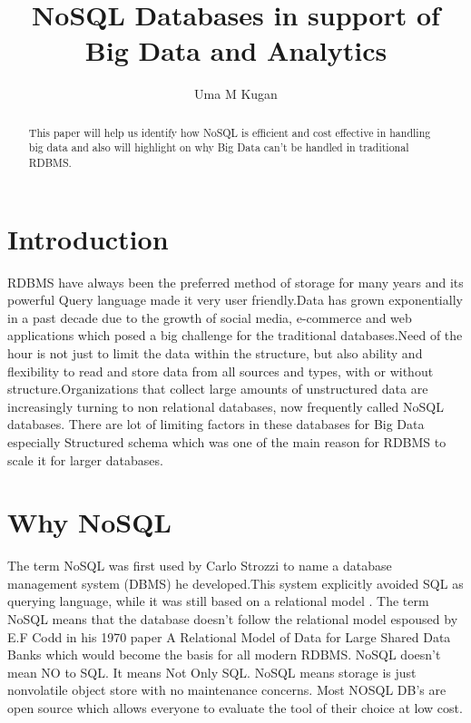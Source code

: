 \documentclass[sigconf]{acmart}
\begin{document}
\title{NoSQL Databases in support of Big Data and Analytics}


\author{Uma M Kugan}

\renewcommand{\shortauthors}{Uma}


\begin{abstract}
This paper will help us identify how NoSQL is efficient and cost effective in handling big data and also will highlight on why Big Data can't be handled in traditional RDBMS.
\end{abstract}



\maketitle

\section{Introduction}

RDBMS have always been the preferred method of storage for many years and its powerful Query language made it very user friendly.Data has grown exponentially in a past decade due to the growth of social media, e-commerce and web applications which posed a big challenge for the traditional databases.Need of the hour is not just to limit the data within the structure, but also ability and flexibility to read and store data from all sources and types, with or without structure.Organizations that collect large amounts of unstructured data are increasingly turning to non relational databases, now frequently called NoSQL databases. \cite{neal} There are lot of limiting factors in these databases for Big Data especially Structured schema which was one of the main reason for RDBMS to scale it for larger databases. \cite{aspirenosql}

\section{Why NoSQL}
The term NoSQL was first used by Carlo Strozzi to name a database management system (DBMS) he developed.This system explicitly avoided SQL as querying language, while it was still based on a relational model \cite{seasupenn}. The term NoSQL means that the database doesn't follow the relational model espoused by E.F Codd in his 1970 paper A Relational Model of Data for Large Shared Data Banks \cite{rdbms} which would become the basis for all modern RDBMS.  NoSQL doesn't mean NO to SQL. It means Not Only SQL. NoSQL means storage is just nonvolatile object store with no maintenance concerns. Most NOSQL DB's are open source which allows everyone to evaluate the tool of their choice at low cost.
\end{document}
